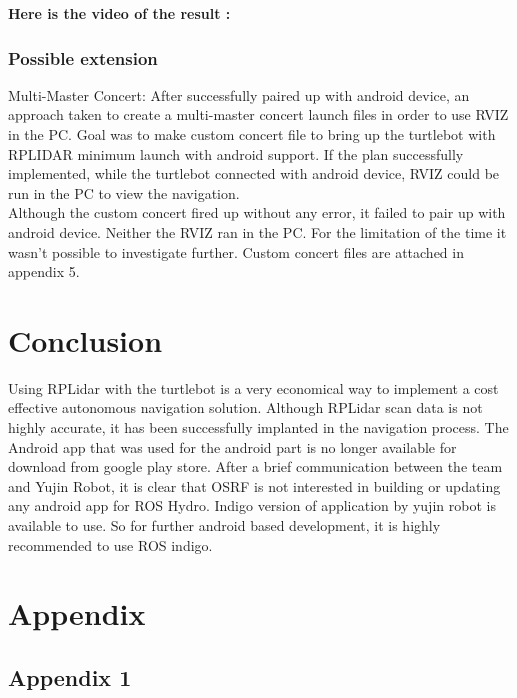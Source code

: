 \documentclass[10pt,a4paper]{article}
\begin{document}
\textbf{Here is the video of the result : }\\
 
\subsubsection{Possible extension}

Multi-Master Concert: After successfully paired up with android device, an approach taken to create a multi-master concert launch files in order to use RVIZ in the PC. Goal was to make custom concert file to bring up the turtlebot with RPLIDAR minimum launch with android support. If the plan successfully implemented, while the turtlebot connected with android device, RVIZ could be run in the PC to view the navigation. \\

Although the custom concert fired up without any error, it failed to pair up with android device. Neither the RVIZ ran in the PC. For the limitation of the time it wasn’t possible to investigate further. Custom concert files are attached in appendix 5. 

\section{Conclusion}

Using RPLidar with the turtlebot is a very economical way to implement a cost effective autonomous navigation solution.  Although RPLidar scan data is not highly accurate, it has been successfully implanted in the navigation process. The Android app that was used for the android part is no longer available for download from google play store. After a brief communication between the team and Yujin Robot, it is clear that OSRF is not  interested in building or updating any android app for ROS Hydro.  Indigo version of application by yujin robot is available to use. So for further android based development, it is highly recommended to use ROS indigo. \\

\newpage

\section{Appendix}

\subsection{Appendix 1}
\end{document}

